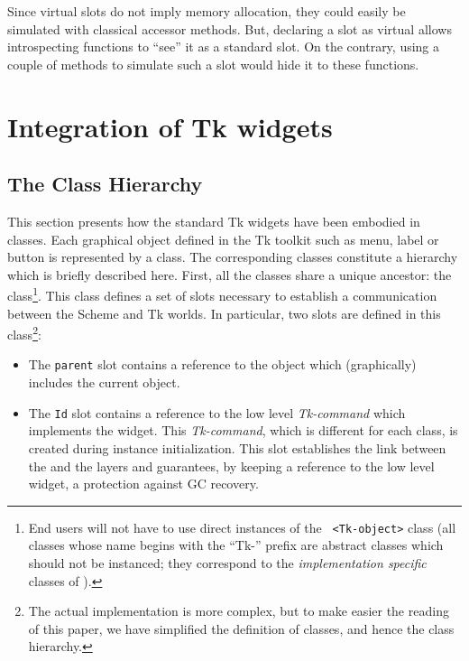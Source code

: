 {Since virtual slots do not imply memory allocation, they could easily be
simulated with classical accessor methods. But, declaring a slot as
virtual allows introspecting functions to ``see'' it as a standard slot. On
the contrary, using a couple of methods to simulate such a slot would hide
it to these functions.


\section{Integration of Tk widgets}
\label{reification}

\subsection{The Class Hierarchy}

This section presents how the standard Tk widgets have been embodied in
{\stklos} classes. Each graphical object defined in the Tk toolkit such as
menu, label or button is represented by a {\stklos} class. The
corresponding classes constitute a hierarchy which is briefly described
here. First, all the classes share a unique ancestor: the {\tt <Tk-object>}
class\footnote{End users will not have to use direct instances of the {\tt
<Tk-object>} class (all classes whose name begins with the ``Tk-'' prefix
are abstract classes which should not be instanced; they correspond to the
{\em implementation specific} classes of
\cite{Kickzales:oopsla92}).}. This class defines a set of slots
necessary to establish a communication between the Scheme and Tk
worlds. In particular, two slots are defined in this
class\footnote{The actual implementation is more complex, but to make
easier the reading of this paper, we have simplified the definition of
classes, and hence the class hierarchy.}:
\begin{itemize}
		\item The {\tt parent}\label{parent-slot} slot contains a
reference to the object which (graphically) includes the current object.
\item The {\tt Id} slot contains a reference to the low level {\stk} {\em
Tk-command} which implements the {\stklos} widget. This {\em Tk-command},
which is different for each class, is created during {\stklos} instance
initialization. This slot establishes the link between the {\stk} and the
{\stklos} layers and guarantees, by keeping a reference to the low level
widget, a protection against GC recovery.
\end{itemize}

}
